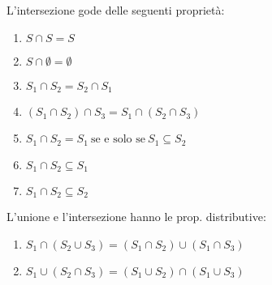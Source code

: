 
\begin{prop}
    L'intersezione gode delle seguenti proprietà:
\end{prop}
\begin{enumerate}
  \item $S \cap S = S$
  \item $S \cap \emptyset = \emptyset$
  \item $S_1 \cap S_2 = S_2 \cap S_1$
  \item $(S_1 \cap S_2) \cap S_3 = S_1 \cap (S_2 \cap S_3)$
  \item $S_1 \cap S_2 = S_1 \ \text{se e solo se} \ S_1 \subseteq S_2$
  \item $S_1 \cap S_2 \subseteq S_1$
  \item $S_1 \cap S_2 \subseteq S_2$
\end{enumerate}


\begin{prop}
L'unione e l'intersezione hanno le prop. distributive:
\end{prop}
\begin{enumerate}
  \item $S_1 \cap (S_2 \cup S_3) = (S_1 \cap S_2) \cup (S_1 \cap S_3)$
  \item $S_1 \cup (S_2 \cap S_3) = (S_1 \cup S_2) \cap (S_1 \cup S_3)$
\end{enumerate}

